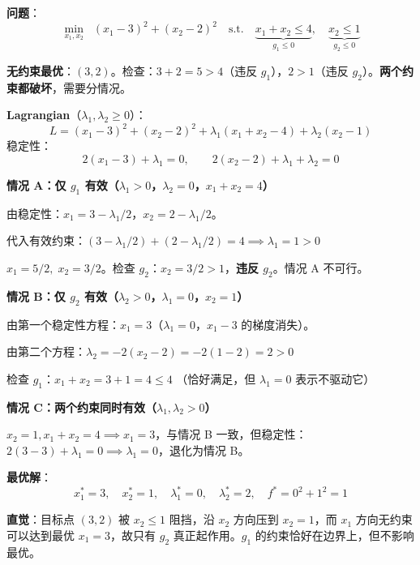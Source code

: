 \documentclass[12pt, a4paper]{ctexart}
\begin{document}
\begin{blackboard}

\textbf{问题}：
\[
\min_{x_1, x_2} \;\; (x_1 - 3)^2 + (x_2 - 2)^2 \quad \text{s.t.} \quad \underbrace{x_1 + x_2 \leq 4}_{g_1 \leq 0}, \quad \underbrace{x_2 \leq 1}_{g_2 \leq 0}
\]

\textbf{无约束最优}：$(3, 2)$。检查：$3+2=5>4$（违反 $g_1$），$2>1$（违反 $g_2$）。\textbf{两个约束都破坏}，需要分情况。

\textbf{Lagrangian}（$\lambda_1, \lambda_2 \geq 0$）：
\[
L = (x_1-3)^2 + (x_2-2)^2 + \lambda_1(x_1+x_2-4) + \lambda_2(x_2-1)
\]
稳定性：
\[
2(x_1-3) + \lambda_1 = 0, \qquad 2(x_2-2) + \lambda_1 + \lambda_2 = 0
\]

\textbf{情况 A：仅 $g_1$ 有效（$\lambda_1>0$，$\lambda_2=0$，$x_1+x_2=4$）}

由稳定性：$x_1 = 3 - \lambda_1/2$，$x_2 = 2 - \lambda_1/2$。

代入有效约束：$(3-\lambda_1/2)+(2-\lambda_1/2)=4 \implies \lambda_1 = 1 > 0$ \checkmark

$x_1 = 5/2,\; x_2 = 3/2$。检查 $g_2$：$x_2 = 3/2 > 1$，\textbf{违反 $g_2$}。情况 A 不可行。

\textbf{情况 B：仅 $g_2$ 有效（$\lambda_2>0$，$\lambda_1=0$，$x_2=1$）}

由第一个稳定性方程：$x_1 = 3$（$\lambda_1=0$，$x_1-3$ 的梯度消失）。

由第二个方程：$\lambda_2 = -2(x_2-2) = -2(1-2) = 2 > 0$ \checkmark

检查 $g_1$：$x_1+x_2 = 3+1 = 4 \leq 4$ \checkmark（恰好满足，但 $\lambda_1=0$ 表示不驱动它）

\textbf{情况 C：两个约束同时有效（$\lambda_1, \lambda_2 > 0$）}

$x_2=1, x_1+x_2=4 \implies x_1=3$，与情况 B 一致，但稳定性：$2(3-3)+\lambda_1=0 \implies \lambda_1=0$，退化为情况 B。

\textbf{最优解}：
\[
x_1^* = 3,\quad x_2^* = 1,\quad \lambda_1^* = 0,\quad \lambda_2^* = 2,\quad f^* = 0^2 + 1^2 = 1
\]

\textbf{直觉}：目标点 $(3,2)$ 被 $x_2 \leq 1$ 阻挡，沿 $x_2$ 方向压到 $x_2=1$，而 $x_1$ 方向无约束可以达到最优 $x_1=3$，故只有 $g_2$ 真正起作用。$g_1$ 的约束恰好在边界上，但不影响最优。

\end{blackboard}
\end{document}
